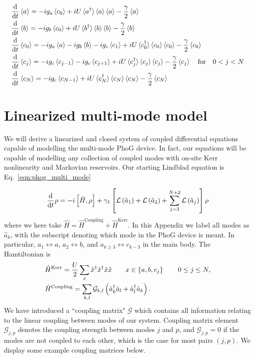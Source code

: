 \begin{align}
&\ddt \ev{a} = - i g_a \ev{c_0} + i U \ev*{a^\dagger} \ev{a} \ev{a} - \frac{\gamma}{2} \ev{a} \notag \\
%
&\ddt \ev{b} = - i g_b \ev{c_0} + i U \ev*{b^\dagger}\ev{b} \ev{b} - \frac{\gamma}{2} \ev{b} \notag \\
%
&\ddt \ev{c_0} = - i g_a \ev{a} - i g_b \ev{b} - i g_c \ev{c_1} + i U \ev*{c_0^\dagger} \ev{c_0} \ev{c_0} - \frac{\gamma}{2} \ev{c_0} \notag \\
%
&\ddt \ev{c_j} = - i g_c \ev{c_{j-1}} - i g_c \ev{c_{j+1}} + i U \ev*{c_j^\dagger} \ev{c_j} \ev{c_j} - \frac{\gamma}{2} \ev{c_j} \qq{for} 0< j < N \notag \\
%
&\ddt \ev{c_N} = - i g_c \ev{c_{N-1}} + i U \ev*{c_N^\dagger}\ev{c_N} \ev{c_N} - \frac{\gamma}{2} \ev{c_N}
\end{align}


\section{Linearized multi-mode model}\label{appendix:multi_mode_linear}
We will derive a linearized and closed system of coupled differential equations capable of modelling the multi-mode PhoG device. In fact, our equations will be capable of modelling any collection of coupled modes with on-site Kerr nonlinearity and Markovian reservoirs. Our starting Lindblad equation is Eq.~\ref{eqn:phog_multi_mode}

\begin{equation}
\frac{\mathrm{d}}{\mathrm{d}t} \rho = - i \left[\hat{H}, \rho\right] + \gamma_1 \left[\mathcal{L}\left(\hat{a}_1\right) + \mathcal{L}\left(\hat{a}_2\right) + \sum_{j=3}^{N+2} \mathcal{L}\left(\hat{a}_j\right) \right] \rho
\end{equation}
where we here take $\hat{H} = \hat{H}^{\text{Coupling}} + \hat{H}^{\text{Kerr}}$. In this Appendix we label all modes as $\hat{a}_k$, with the subscript denoting which mode in the PhoG device is meant. In particular, $a_1 \leftrightarrow a$, $a_2 \leftrightarrow b$, and $a_{k \ge 3} \leftrightarrow c_{k-3}$ in the main body. The Hamtiltonian is
\begin{align}
&\hat{H}^{\text{Kerr}} = \frac{U}{2} \sum_{x} \hat{x}^\dagger \hat{x}^\dagger \hat{x} \hat{x} \qq{} x \in \left\{a, b, c_j\right\} \qq{} 0 \le j \le N, \notag \\
%
&\hat{H}^{\text{Coupling}} = \sum_{k, l} \mathcal{G}_{k, l}\left(\hat{a}_k^\dagger \hat{a}_l + \hat{a}_l^\dagger \hat{a}_k \right).
\end{align}
We have introduced a ``coupling matrix" $\mathcal{G}$ which contains all information relating to the linear coupling between modes of our system. Coupling matrix element $\mathcal{G}_{j, p}$ denotes the coupling strength between modes $j$ and $p$, and $\mathcal{G}_{j, p} = 0$ if the modes are not coupled to each other, which is the case for most pairs $\left(j, p\right)$. We display some example coupling matrices below.
